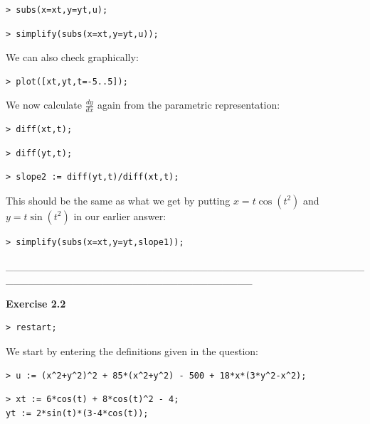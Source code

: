\documentclass{article}
\begin{document}
\begin{lstlisting}
> subs(x=xt,y=yt,u);
\end{lstlisting}
\begin{lstlisting}
> simplify(subs(x=xt,y=yt,u));
\end{lstlisting}
\begin{Maple Normal}
We can also check graphically:
\end{Maple Normal}
\begin{lstlisting}
> plot([xt,yt,t=-5..5]);
\end{lstlisting}
\begin{Maple Normal}
We now calculate 
$\frac{\mathit{dy}}{\mathit{dx}}$ again from the parametric representation:
\end{Maple Normal}
\begin{lstlisting}
> diff(xt,t);
\end{lstlisting}
\begin{lstlisting}
> diff(yt,t);
\end{lstlisting}
\begin{lstlisting}
> slope2 := diff(yt,t)/diff(xt,t);
\end{lstlisting}
\begin{Maple Normal}
This should be the same as what we get by putting 
$x =t \cos (t^{2})$ and 
$y =t \sin (t^{2})$ in our earlier answer:
\end{Maple Normal}
\begin{lstlisting}
> simplify(subs(x=xt,y=yt,slope1));
\end{lstlisting}
\begin{Maple Normal}
\_\_\_\_\_\_\_\_\_\_\_\_\_\_\_\_\_\_\_\_\_\_\_\_\_\_\_\_\_\_\_\_\_\_\_\_\_\_\_\_\_\_\_\_\_\_\_\_\_\_\_\_\_\_\_\_\_\_\_\_\_\_\_\_\_\_\_\_\_\_\_\_\_\_\_\_\_\_\_\_\_
\end{Maple Normal}
\begin{Maple Heading 2}
\textbf{Exercise 2.2}
\end{Maple Heading 2}
\begin{lstlisting}
> restart;
\end{lstlisting}
\begin{Maple Normal}
We start by entering the definitions given in the question:
\end{Maple Normal}
\begin{lstlisting}
> u := (x^2+y^2)^2 + 85*(x^2+y^2) - 500 + 18*x*(3*y^2-x^2);
\end{lstlisting}
\begin{lstlisting}
> xt := 6*cos(t) + 8*cos(t)^2 - 4;
yt := 2*sin(t)*(3-4*cos(t));
\end{lstlisting}
\end{document}
